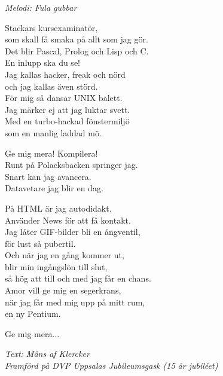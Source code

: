 {\footnotesize\textit{Melodi: Fula gubbar}}\par
\vspace{10pt}
Stackars kursexaminatör,\\
som skall få smaka på allt som jag gör.\\
Det blir Pascal, Prolog och Lisp och C.\\
En inlupp ska du se!\\
Jag kallas hacker, freak och nörd\\
och jag kallas även störd.\\
För mig så dansar UNIX balett.\\
Jag märker ej att jag luktar svett.\\
Med en turbo-hackad fönstermiljö\\
som en manlig laddad mö.\par
\vspace{10pt}
Ge mig mera! Kompilera!\\
Runt på Polacksbacken springer jag.\\
Snart kan jag avancera.\\
Datavetare jag blir en dag.\par
\newpage
På HTML är jag autodidakt.\\
Använder News för att få kontakt.\\
Jag låter GIF-bilder bli en ångventil,\\
för lust så pubertil.\\
Och när jag en gång kommer ut,\\
blir min ingångslön till slut,\\
så hög att till och med jag får en chans.\\
Amor vill ge mig en segerkrans,\\
när jag får med mig upp på mitt rum,\\
en ny Pentium.\par
\vspace{10pt}
Ge mig mera...\par
\vspace{10pt}
{\footnotesize\textit{Text: Måns af Klercker\\Framförd på DVP
      Uppsalas Jubileumsgask (15 år jubiléet)}}
